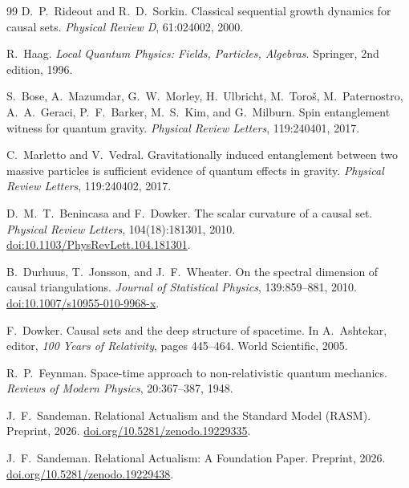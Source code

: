 \documentclass[11pt,a4paper]{article}
\theoremstyle{plain}
\theoremstyle{definition}
\theoremstyle{remark}
\begin{document}
\begin{thebibliography}{99}
D.~P.~Rideout and R.~D.~Sorkin.
\newblock Classical sequential growth dynamics for causal sets.
\newblock \textit{Physical Review D}, 61:024002, 2000.

R.~Haag.
\newblock \textit{Local Quantum Physics: Fields, Particles, Algebras}.
\newblock Springer, 2nd edition, 1996.

S.~Bose, A.~Mazumdar, G.~W.~Morley, H.~Ulbricht, M.~Toro\v{s},
  M.~Paternostro, A.~A.~Geraci, P.~F.~Barker, M.~S.~Kim, and G.~Milburn.
\newblock Spin entanglement witness for quantum gravity.
\newblock \textit{Physical Review Letters}, 119:240401, 2017.

C.~Marletto and V.~Vedral.
\newblock Gravitationally induced entanglement between two massive particles is
  sufficient evidence of quantum effects in gravity.
\newblock \textit{Physical Review Letters}, 119:240402, 2017.


D.~M.~T.~Benincasa and F.~Dowker.
\newblock The scalar curvature of a causal set.
\newblock \emph{Physical Review Letters}, 104(18):181301, 2010.
\newblock \href{https://doi.org/10.1103/PhysRevLett.104.181301}{doi:10.1103/PhysRevLett.104.181301}.

B.~Durhuus, T.~Jonsson, and J.~F.~Wheater.
\newblock On the spectral dimension of causal triangulations.
\newblock \emph{Journal of Statistical Physics}, 139:859--881, 2010.
\newblock \href{https://doi.org/10.1007/s10955-010-9968-x}{doi:10.1007/s10955-010-9968-x}.

F.~Dowker.
\newblock Causal sets and the deep structure of spacetime.
\newblock In A.~Ashtekar, editor, \textit{100 Years of Relativity}, pages
  445--464. World Scientific, 2005.

R.~P.~Feynman.
\newblock Space-time approach to non-relativistic quantum mechanics.
\newblock \textit{Reviews of Modern Physics}, 20:367--387, 1948.

J.~F.~Sandeman.
\newblock Relational Actualism and the Standard Model ({RASM}).
\newblock Preprint, 2026.
\newblock \href{https://doi.org/10.5281/zenodo.19229335}{doi.org/10.5281/zenodo.19229335}.

J.~F.~Sandeman.
\newblock Relational Actualism: A Foundation Paper.
\newblock Preprint, 2026.
\newblock \href{https://doi.org/10.5281/zenodo.19229438}{doi.org/10.5281/zenodo.19229438}.

\end{thebibliography}
\end{document}
